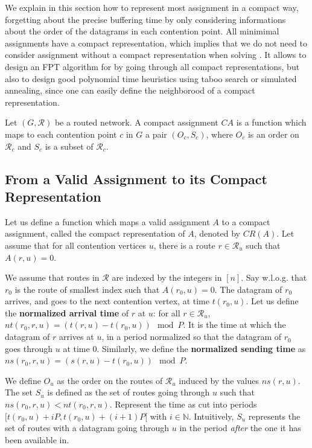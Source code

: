 We explain in this section how to represent most assignment in a compact way, forgetting about the precise buffering time by only considering informations about the order of the datagrams in each contention point. All minimimal assignments have a compact representation, which implies that we do not need to consider assignment without a compact representation when solving \spall. 
It allows to design an FPT algorithm for \spall by going through all compact representations, but also to design good polynomial time heuristics using taboo search or simulated annealing, since one can easily define the neighborood of a compact representation.


\begin{definition}
Let $(G, \mathcal{R})$ be a routed network. A compact assignment $CA$ is a function which maps to each contention point $c$ in $G$ a pair $(O_c,S_c)$, where $O_c$ is an order on $\mathcal{R}_c$ and $S_c$ is a subset of $\mathcal{R}_c$.
\label{definition:compact}
\end{definition}


\subsection{From a Valid Assignment to its Compact Representation}

Let us define a function which maps a valid assignment $A$ to a compact assignment, called the compact representation of $A$, denoted by $CR(A)$. Let assume that for all contention vertices $u$, there is a route $r \in \mathcal{R}_u$ such that $A(r,u) = 0$.

We assume that routes in $\mathcal{R}$ are indexed by the integers in $[n]$. Say w.l.o.g. that $r_0$ is the route of smallest index such that $A(r_0,u) = 0$. The datagram of $r_0$ arrives, and goes to the next contention vertex, at time $t(r_0,u)$. Let us define the \textbf{normalized arrival time} of $r$ at $u$: for all $r \in \mathcal{R}_u$, $nt(r_0,r,u) = (t(r,u) - t(r_0,u)) \mod P$. It is the time at which the datagram of $r$ arrives at $u$, in a period normalized so that the datagram of $r_0$ goes through $u$ at time $0$. Similarly, we define the \textbf{normalized sending time} as $ns(r_0,r,u) = (s(r,u) - t(r_0,u)) \mod P$.

We define $O_u$ as the order on the routes of $\mathcal{R}_u$ induced by the values $ns(r,u)$. The set $S_u$ is defined as the set of routes going through $u$ such that $ns(r_0,r,u) < nt(r_0,r,u)$. Represent the time as cut into periods $[t(r_0,u) + iP,t(r_0,u) + (i+1)P [$ with $i \in \mathbb{N}$. Intuitively, $S_u$ represents the set of routes with a datagram going through $u$ in the period \emph{after} the one it has been available in. 

